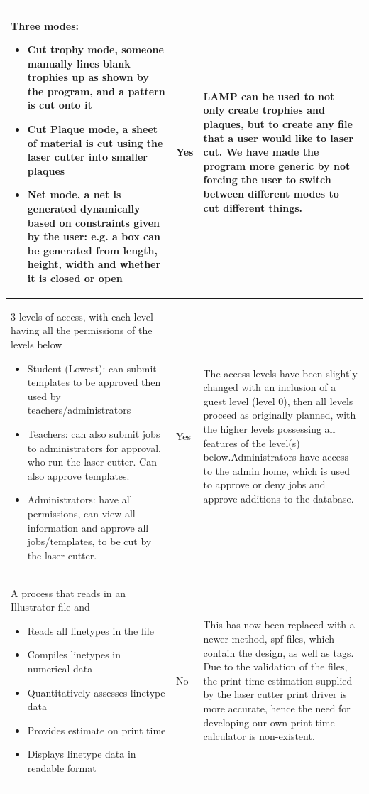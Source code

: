 \documentclass[oneside,openany,11pt,a4paper]{report}
\begin{document}
\begin{longtable}{|p{4cm}|p{2cm}|p{8cm}|}
	Three modes: 
		\begin{itemize}
		\itemsep0em
		\item Cut trophy mode, someone manually lines blank trophies up as shown by the program, and a pattern is cut onto it
		\item Cut Plaque mode, a sheet of material is cut using the laser cutter into smaller plaques
		\item Net mode, a net is generated dynamically based on constraints given by the user: e.g. a box can be generated from length, height, width and whether it is closed or open
	\end{itemize} & 
	Yes &
	LAMP can be used to not only create trophies and plaques, but to create any file that a user would like to laser cut.\newline
	We have made the program more generic by not forcing the user to switch between different modes to cut different things.
	\\ \hline
	3 levels of access, with each level having all the permissions of the levels below 
		\begin{itemize}
		\itemsep0em
		\item Student (Lowest): can submit templates to be approved then used by teachers/administrators
		\item Teachers: can also submit jobs to administrators for approval, who run the laser cutter. Can also approve templates.
		\item Administrators: have all permissions, can view all information and approve all jobs/templates, to be cut by the laser cutter.
	\end{itemize} & 
	Yes &
The access levels have been slightly changed with an inclusion of a guest level (level 0), then all levels proceed as originally planned, with the higher levels possessing all features of the level(s) below.\newline Administrators have access to the admin home, which is used to approve or deny jobs and approve additions to the database. \\ \hline
	A process that reads in an Illustrator file and
		\begin{itemize}
		\itemsep0em
		\item Reads all linetypes in the file
		\item Compiles linetypes in numerical data
		\item Quantitatively assesses linetype data
		\item Provides estimate on print time
		\item Displays linetype data in readable format
	\end{itemize} & 
	No &
	This has now been replaced with a newer method, spf files, which contain the design, as well as tags. \newline
	Due to the validation of the files, the print time estimation supplied by the laser cutter print driver is more accurate, hence the need for developing our own print time calculator is non-existent. \\ \hline
\end{longtable}
\end{document}
